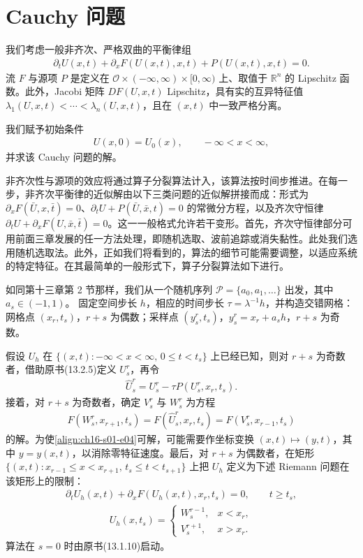 \documentclass[../../main.tex]{subfiles}
\begin{document}
\section{Cauchy 问题}\label{section:ch16-cauchy问题}

我们考虑一般非齐次、严格双曲的平衡律组
\begin{align}
\partial_t U(x,t)+\partial_x F(U(x,t),x,t)+P(U(x,t),x,t)=0.
\label{align:ch16-s01-e01}
\end{align}
流 $F$ 与源项 $P$ 是定义在 $\mathscr{O}\times(-\infty,\infty)\times[0,\infty)$ 上、取值于 $\mathbb{R}^n$ 的 Lipschitz 函数。此外，Jacobi 矩阵 $DF(U,x,t)$ Lipschitz，具有实的互异特征值 $\lambda_1(U,x,t)<\cdots<\lambda_n(U,x,t)$，且在 $(x,t)$ 中一致严格分离。

我们赋予初始条件
\begin{align}
U(x,0)=U_0(x),\qquad-\infty<x<\infty,
\label{align:ch16-s01-e02}
\end{align}
并求该 Cauchy 问题的解。

非齐次性与源项的效应将通过算子分裂算法计入，该算法按时间步推进。在每一步，非齐次平衡律的近似解由以下三类问题的近似解拼接而成：形式为 $\partial_xF(\bar U,x,\bar t)=0$、$\partial_tU+P(\bar U,\bar x,t)=0$ 的常微分方程，以及齐次守恒律 $\partial_tU+\partial_xF(U,\bar x,\bar t)=0$。这一一般格式允许若干变形。首先，齐次守恒律部分可用前面三章发展的任一方法处理，即随机选取、波前追踪或消失黏性。此处我们选用随机选取法。此外，正如我们将看到的，算法的细节可能需要调整，以适应系统的特定特征。在其最简单的一般形式下，算子分裂算法如下进行。

如同第十三章第 2 节那样，我们从一个随机序列 $\mathscr{P}=\{a_0,a_1,\ldots\}$ 出发，其中 $a_s\in(-1,1)$。
固定空间步长 $h$，相应的时间步长 $\tau=\lambda^{-1}h$，并构造交错网格：网格点 $(x_r,t_s)$，$r+s$ 为偶数；采样点 $(y_s^r,t_s)$，$y_s^r=x_r+a_sh$，$r+s$ 为奇数。

假设 $U_h$ 在 $\{(x,t):-\infty<x<\infty,\,0\leqslant t<t_s\}$ 上已经已知，则对 $r+s$ 为奇数者，借助原书(13.2.5)定义 $U_s^r$，再令
\begin{align}
\hat U_s^r=U_s^r-\tau P(U_s^r,x_r,t_s).
\label{align:ch16-s01-e03}
\end{align}
接着，对 $r+s$ 为奇数者，确定 $V_s^r$ 与 $W_s^r$ 为方程
\begin{align}
F(W_s^r,x_{r+1},t_s)=F(\hat U_s^r,x_r,t_s)=F(V_s^r,x_{r-1},t_s)
\label{align:ch16-s01-e04}
\end{align}
的解。为使\eqref{align:ch16-s01-e04}可解，可能需要作坐标变换 $(x,t)\mapsto(y,t)$，其中 $y=y(x,t)$，以消除零特征速度。最后，对 $r+s$ 为偶数者，在矩形 $\{(x,t):x_{r-1}\leqslant x<x_{r+1},\,t_s\leqslant t<t_{s+1}\}$ 上把 $U_h$ 定义为下述 Riemann 问题在该矩形上的限制：
\begin{align}
\partial_tU_h(x,t)+\partial_xF(U_h(x,t),x_r,t_s)=0,\qquad t\geqslant t_s,
\label{align:ch16-s01-e05}
\end{align}
\begin{align}
U_h(x,t_s)=
\begin{cases}
W_s^{r-1},&x<x_r,\\
V_s^{r+1},&x>x_r.
\end{cases}
\label{align:ch16-s01-e06}
\end{align}
算法在 $s=0$ 时由原书(13.1.10)启动。
\end{document}
